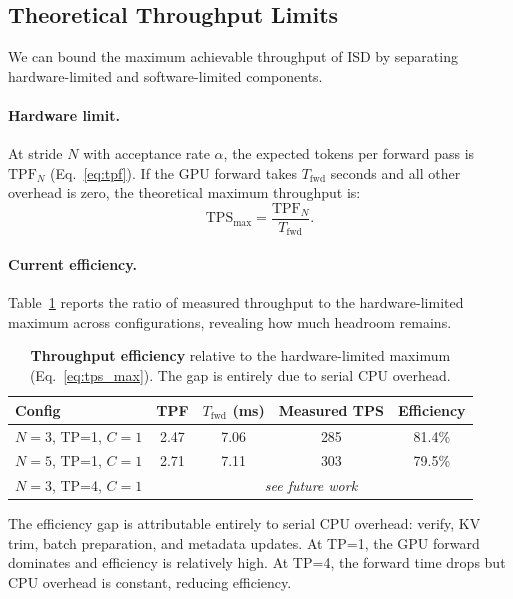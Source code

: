 \subsection{Theoretical Throughput Limits}
\label{sec:theoretical}

We can bound the maximum achievable throughput of ISD by separating hardware-limited and software-limited components.

\paragraph{Hardware limit.}
At stride $N$ with acceptance rate $\alpha$, the expected tokens per forward pass is $\text{TPF}_N$ (Eq.~\ref{eq:tpf}). If the GPU forward takes $T_{\text{fwd}}$ seconds and all other overhead is zero, the theoretical maximum throughput is:
\begin{equation}
\text{TPS}_{\max} = \frac{\text{TPF}_N}{T_{\text{fwd}}}.
\label{eq:tps_max}
\end{equation}

\paragraph{Current efficiency.}
Table~\ref{tab:efficiency} reports the ratio of measured throughput to the hardware-limited maximum across configurations, revealing how much headroom remains.

\begin{table}[t]
\centering
\caption{\textbf{Throughput efficiency} relative to the hardware-limited maximum (Eq.~\ref{eq:tps_max}). The gap is entirely due to serial CPU overhead.}
\label{tab:efficiency}
\small
\begin{tabular}{lcccc}
\toprule
\textbf{Config} & \textbf{TPF} & $T_{\text{fwd}}$ \textbf{(ms)} & \textbf{Measured TPS} & \textbf{Efficiency} \\
\midrule
$N{=}3$, TP=1, $C{=}1$ & 2.47 & 7.06 & 285 & 81.4\% \\
$N{=}5$, TP=1, $C{=}1$ & 2.71 & 7.11 & 303 & 79.5\% \\
$N{=}3$, TP=4, $C{=}1$ & \multicolumn{4}{c}{\emph{see future work}} \\
\bottomrule
\end{tabular}
\end{table}

The efficiency gap is attributable entirely to serial CPU overhead: verify, KV trim, batch preparation, and metadata updates. At TP=1, the GPU forward dominates and efficiency is relatively high. At TP=4, the forward time drops but CPU overhead is constant, reducing efficiency.

